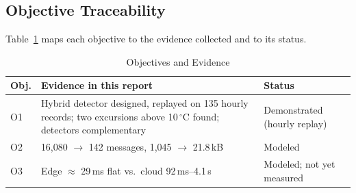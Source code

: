 \documentclass[conference]{IEEEtran}
\newcommand{\degC}{\ensuremath{^{\circ}}C}
\begin{document}
\subsection{Objective Traceability}
Table~\ref{tab:obj} maps each objective to the evidence collected and to its status.

\begin{table}[t]
\caption{Objectives and Evidence}
\label{tab:obj}
\centering
\footnotesize
\begin{tabular}{p{}p{}p{}}
\toprule
Obj. & Evidence in this report & Status \\
\midrule
O1 & Hybrid detector designed, replayed on 135 hourly records; two excursions above 10\,\degC{} found; detectors complementary & Demonstrated (hourly replay) \\
O2 & 16,080 $\rightarrow$ 142 messages, 1,045 $\rightarrow$ 21.8\,kB & Modeled \\
O3 & Edge $\approx$ 29\,ms flat vs.\ cloud 92\,ms--4.1\,s & Modeled; not yet measured \\
\bottomrule
\end{tabular}
\end{table}

\end{document}
